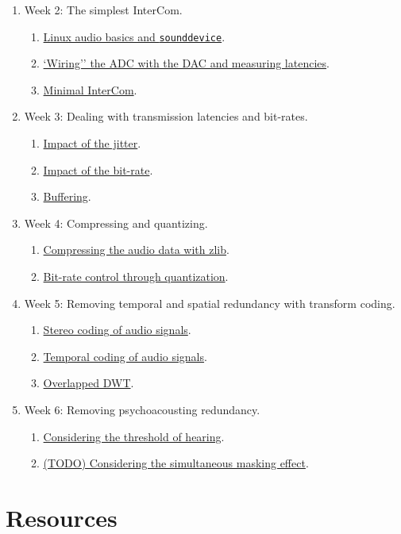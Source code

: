 \begin{enumerate}


\item Week 2: The simplest InterCom.
\begin{enumerate}
\item \href{https://tecnologias-multimedia.github.io/study_guide/Linux_audio/}{Linux audio basics and \texttt{sounddevice}}.
\item \href{https://tecnologias-multimedia.github.io/study_guide/04-wiring/}{`Wiring'' the ADC with the DAC and measuring latencies}.
\item \href{https://tecnologias-multimedia.github.io/study_guide/05-minimal/}{Minimal InterCom}.
\end{enumerate}
\item Week 3: Dealing with transmission latencies and bit-rates.
\begin{enumerate}
\item \href{https://tecnologias-multimedia.github.io/study_guide/06-jitter_impact/}{Impact of the jitter}.
\item \href{https://tecnologias-multimedia.github.io/study_guide/07-bit-rate_impact/}{Impact of the bit-rate}.
\item \href{https://tecnologias-multimedia.github.io/study_guide/08-buffer/}{Buffering}.
\end{enumerate}
\item Week 4: Compressing and quantizing.
\begin{enumerate}
\item \href{https://tecnologias-multimedia.github.io/study_guide/09-compress/}{Compressing the audio data with zlib}.
\item \href{https://tecnologias-multimedia.github.io/study_guide/10-br_control/}{Bit-rate control through quantization}.
\end{enumerate}
\item Week 5: Removing temporal and spatial redundancy with transform coding.
\begin{enumerate}
\item \href{https://tecnologias-multimedia.github.io/study_guide/11-stereo_coding/}{Stereo coding of audio signals}.
\item \href{https://tecnologias-multimedia.github.io/study_guide/12-temporal_coding/}{Temporal coding of audio signals}.
\item \href{https://tecnologias-multimedia.github.io/study_guide/13-overlapped_temporal_coding/}{Overlapped DWT}.
\end{enumerate}
\item Week 6: Removing psychoacousting redundancy.
\begin{enumerate}
\item \href{https://tecnologias-multimedia.github.io/study_guide/14-threshold_of_hearing/}{Considering the threshold of hearing}.
\item \href{https://tecnologias-multimedia.github.io/study_guide/15-simultaneous_masking/}{(TODO) Considering the simultaneous masking effect}.
\end{enumerate}
\end{enumerate}

\section{Resources}


